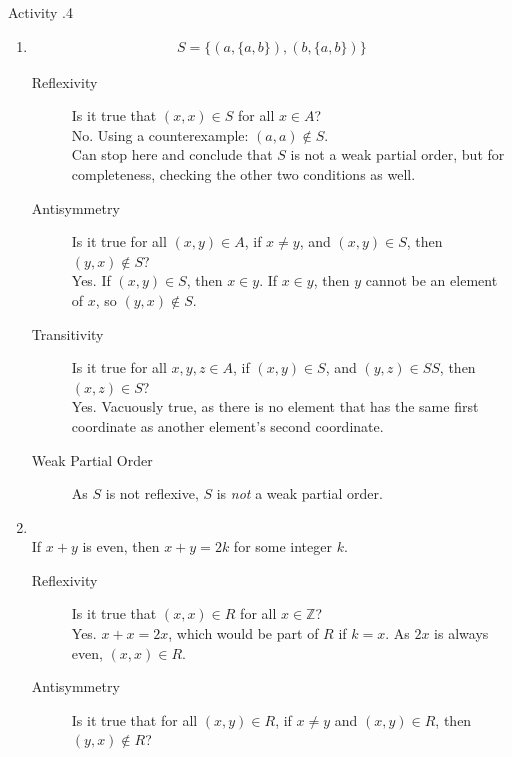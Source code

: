 \documentclass[../notes.tex]{subfiles}
\begin{document}
				\begin{exercise}{Activity \thechapter.4}
					\begin{enumerate}[label=(\alph*)]
						\item {}
							\begin{align*}
								S = \bigl\{(a, \{a, b\}), (b, \{a, b\})\bigr\}
							\end{align*}
							\begin{description}
								\item[Reflexivity] Is it true that $(x, x) \in S$ for all $x \in A$?\\
									No. Using a counterexample: $(a, a) \notin S$.\\
									Can stop here and conclude that $S$ is not a weak partial order, but for completeness, checking the other two conditions as well.
								\item[Antisymmetry] Is it true for all $(x, y) \in A$, if $x \neq y$, and $(x, y) \in S$, then $(y, x) \notin S$?\\
									Yes. If $(x, y) \in S$, then $x \in y$. If $x \in y$, then $y$ cannot be an element of $x$, so $(y, x) \notin S$.
								\item[Transitivity] Is it true for all $x, y, z \in A$, if $(x, y) \in S$, and $(y, z) \in SS$, then $(x, z) \in S$?\\
									Yes. Vacuously true, as there is no element that has the same first coordinate as another element's second coordinate.
								\item[Weak Partial Order] As $S$ is not reflexive, $S$ is \emph{not} a weak partial order.
							\end{description}
						\item {}\\
							If $x + y$ is even, then $x + y = 2k$ for some integer $k$.
							\begin{description}
								\item[Reflexivity] Is it true that $(x, x) \in R$ for all $x \in \mathbb{Z}$?\\
									Yes. $x + x = 2x$, which would be part of $R$ if $k = x$. As $2x$ is always even, $(x, x) \in R$.
								\item[Antisymmetry] Is it true that for all $(x, y) \in R$, if $x \neq y$ and $(x, y) \in R$, then $(y, x) \notin R$?\\

\end{description}
\end{enumerate}
\end{exercise}
\end{document}
